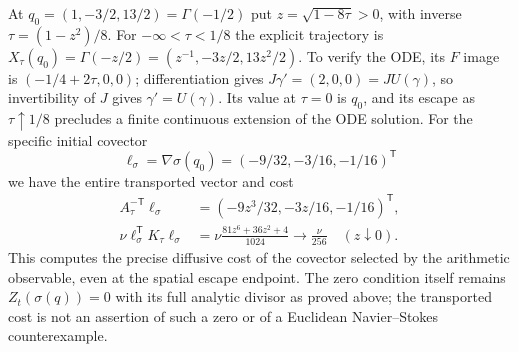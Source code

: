 At $q_0=(1,-3/2,13/2)=\Gamma(-1/2)$ put
$z=\sqrt{1-8\tau}>0$, with inverse $\tau=(1-z^2)/8$.
For $-\infty<\tau<1/8$ the explicit trajectory is
$X_\tau(q_0)=\Gamma(-z/2)=(z^{-1},-3z/2,13z^2/2)$.
To verify the ODE, its $F$ image is $(-1/4+2\tau,0,0)$;
differentiation gives $J\gamma'=(2,0,0)=JU(\gamma)$,
so invertibility of $J$ gives $\gamma'=U(\gamma)$. Its value at
$\tau=0$ is $q_0$, and its escape as $\tau\uparrow1/8$ precludes
a finite continuous extension of the ODE solution. For the specific
initial covector
\[
\ell_\sigma=\nabla\sigma(q_0)=(-9/32,-3/16,-1/16)^{\mathsf T}
\]
we have the entire transported vector and cost
\begin{align*}
A_\tau^{-\mathsf T}\ell_\sigma
 &=(-9z^3/32,-3z/16,-1/16)^{\mathsf T},\\
\nu\ell_\sigma^{\mathsf T}K_\tau\ell_\sigma
 &=\nu\frac{81z^6+36z^2+4}{1024}
   \longrightarrow\frac{\nu}{256}\quad(z\downarrow0).
\end{align*}
This computes the precise diffusive cost of the covector selected
by the arithmetic observable, even at the spatial escape endpoint.
The zero condition itself remains $Z_t(\sigma(q))=0$ with its full
analytic divisor as proved above; the transported cost is not an
assertion of such a zero or of a Euclidean Navier--Stokes counterexample.
